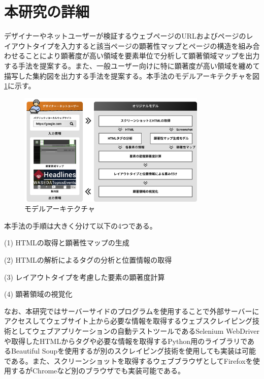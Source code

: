 \newpage
\renewcommand{\baselinestretch}{1.5}
\section{本研究の詳細}
\renewcommand{\baselinestretch}{1}

\par デザイナーやネットユーザーが検証するウェブページのURLおよびページのレイアウトタイプを入力すると該当ページの顕著性マップとページの構造を組み合わせることにより顕著度が高い領域を要素単位で分析して顕著領域マップを出力する手法を提案する。また、一般ユーザー向けに特に顕著度が高い領域を纏めて描写した集約図を出力する手法を提案する。本手法のモデルアーキテクチャを図\ref{fig_ourmodel}に示す。

\begin{figure}[H]
    \centering
    \includegraphics[width=9cm]{figures/model.jpg}
    \caption{モデルアーキテクチャ}
    \label{fig_ourmodel}
\end{figure}

\par 本手法の手順は大きく分けて以下の4つである。
\par(1) HTMLの取得と顕著性マップの生成
\par(2) HTMLの解析によるタグの分析と位置情報の取得
\par(3) レイアウトタイプを考慮した要素の顕著度計算
\par(4) 顕著領域の視覚化\\

\par なお、本研究ではサーバーサイドのプログラムを使用することで外部サーバーにアクセスしてウェブサイト上から必要な情報を取得するウェブスクレイピング技術としてウェブアプリケーションの自動テストツールであるSelenium WebDriver\cite{selenium}や取得したHTMLからタグや必要な情報を取得するPython用のライブラリであるBeautiful Soup\cite{beautifulsoup}を使用するが別のスクレイピング技術を使用しても実装は可能である。また、スクリーンショットを取得するウェブブラウザとしてFirefoxを使用するがChromeなど別のブラウザでも実装可能である。

